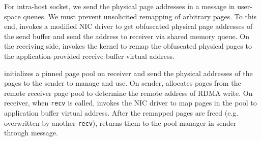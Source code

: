 For intra-host socket, we send the physical page addresses in a message in user-space queues.
We must prevent unsolicited remapping of arbitrary pages.
To this end, \libipc{} invokes a modified NIC driver to 
get obfuscated physical page addresses of the send buffer and send the address to receiver via shared memory queue.
On the receiving side, \libipc{} invokes the kernel to remap the obfuscated physical pages to the application-provided receive buffer virtual address.

\libipc{} initializes a pinned page pool on receiver and send the physical addresses of the pages to the sender to manage and use.
On sender, \libipc{} %
allocates pages from the remote receiver page pool to determine the remote address of RDMA write.
On receiver, when \texttt{recv} is called, \libipc invokes the NIC driver to map pages in the pool to application buffer virtual address.
After the remapped pages are freed (e.g. overwritten by another \texttt{recv}), \libipc{} returns them to the pool manager in sender through message.

%

